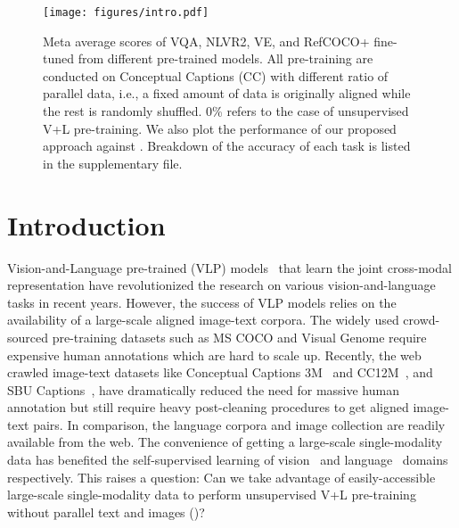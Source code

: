 \begin{figure}[t!]
\centering
\texttt{[image: figures/intro.pdf]}
\caption{Meta average scores of VQA, NLVR2, VE, and RefCOCO+ fine-tuned from different pre-trained models. All pre-training are conducted on Conceptual Captions (CC) with different ratio of parallel data, i.e., a fixed amount of data is originally aligned while the rest is randomly shuffled. 0\% refers to the case of unsupervised V+L pre-training. We also plot the performance of our proposed approach against \uvisualbert \cite{li2020unsupervised}.
Breakdown of the accuracy of each task is listed in the supplementary file.
} 
\label{fig:intro}
\end{figure}

\section{Introduction}\label{section:intro}

Vision-and-Language pre-trained (VLP) models~\cite{lu202012,chen2020uniter,lu2019vilbert,tan2019lxmert,yu2020ernie,li2020unicoder,su2019vl,kim2021vilt,huang2020pixel,wang2021simvlm,li2020unimo,li2021albef,huang2021soho} that learn the joint cross-modal representation have revolutionized the research on various vision-and-language tasks in recent years.
However, the success of VLP models relies on the availability of a large-scale aligned image-text corpora. 
The widely used crowd-sourced pre-training datasets such as MS COCO \cite{lin2014microsoft, chen2015microsoft} and Visual Genome \cite{krishna2017visualgenome} require expensive human annotations which are hard to scale up. 
Recently, the web crawled image-text datasets like Conceptual Captions 3M~\cite{sharma2018conceptual} and CC12M~\cite{changpinyo2021cc12m}, and SBU Captions~\cite{ordonez2011sbu}, \etc have dramatically reduced the need for massive human annotation but still require heavy post-cleaning procedures to get aligned image-text pairs.
In comparison, the language corpora and image collection are readily available from the web.
The convenience of getting a large-scale single-modality data has benefited the self-supervised learning of vision~\cite{bao2021beit,moco,simclr} and language~\cite{devlin2018bert,roberta} domains respectively.  
This raises a question: Can we take advantage of easily-accessible large-scale single-modality data to perform unsupervised V+L pre-training without parallel text and images (\TaskName)? 


